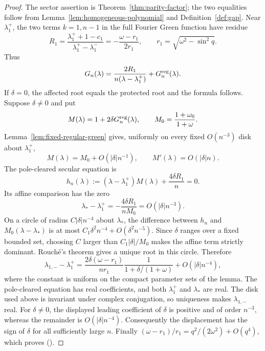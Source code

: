 \documentclass[twoside,10pt]{article}
\numberwithin{equation}{section}
\theoremstyle{slbody}
\theoremstyle{definition}
\theoremstyle{remark}
\renewcommand{\eqref}[1]{%
  \textup{{\normalfont(\oldstylenums{\ref{#1}}}\normalfont)}}
\begin{document}
\begin{proof}
The sector assertion is Theorem~\ref{thm:parity-factor}; the two
equalities follow from Lemma~\ref{lem:homogeneous-polynomial} and
Definition~\ref{def:gap}.  Near
$\lambda_1^+$, the two terms $k=1,n-1$ in the full Fourier Green
function have residue
\[
 R_1=\frac{\lambda_1^++1-c_1}{\lambda_1^+-\lambda_1^-}
    =-\frac{\omega-r_1}{2r_1},
 \qquad r_1=\sqrt{\omega^2-\sin^2q}.
\]
Thus
\[
 G_n(\lambda)=\frac{2R_1}{n(\lambda-\lambda_1^+)}
                  +G_n^{\rm reg}(\lambda).
\]
If $\delta=0$, the affected root equals the protected root and the
formula follows.  Suppose $\delta\ne0$ and put
\[
 M(\lambda)=1+2\delta G_n^{\rm reg}(\lambda),
 \qquad M_0=\frac{1+\omega_0}{1+\omega}.
\]
Lemma~\ref{lem:fixed-regular-green} gives, uniformly on every fixed
$O(n^{-3})$ disk about $\lambda_1^+$,
\[
 M(\lambda)=M_0+O(|\delta|n^{-1}),
 \qquad M'(\lambda)=O(|\delta|n).
\]
The pole-cleared secular equation is
\[
 h_n(\lambda):=(\lambda-\lambda_1^+)M(\lambda)
                  +\frac{4\delta R_1}{n}=0.
\]
Its affine comparison has the zero
\[
 \lambda_* -\lambda_1^+=-\frac{4\delta R_1}{nM_0}=O(|\delta|n^{-3}).
\]
On a circle of radius $C|\delta|n^{-4}$ about $\lambda_*$, the
difference between $h_n$ and
$M_0(\lambda-\lambda_*)$ is at most
$C_1\delta^2n^{-4}+O(\delta^2n^{-5})$.  Since $\delta$ ranges over a
fixed bounded set, choosing $C$ larger than $C_1|\delta|/M_0$ makes the
affine term strictly dominant.  Rouch\'e's theorem gives a unique root
in this circle.  Therefore
\[
 \lambda_{1,-}-\lambda_1^+
 =\frac{2\delta(\omega-r_1)}{nr_1}
    \frac{1}{1+\delta/(1+\omega)}+O(|\delta|n^{-4}),
\]
where the constant is uniform on the compact parameter sets of the
lemma.  The pole-cleared equation has real coefficients, and both
$\lambda_1^+$ and $\lambda_*$ are real.  The disk used above is invariant
under complex conjugation, so uniqueness makes $\lambda_{1,-}$ real.  For
$\delta\ne0$, the displayed leading coefficient of $\delta$ is positive
and of order $n^{-3}$, whereas the remainder is $O(|\delta|n^{-4})$.
Consequently the displacement has the sign of $\delta$ for all sufficiently
large $n$.  Finally
$(\omega-r_1)/r_1=q^2/(2\omega^2)+O(q^4)$, which proves
\eqref{eq:affected-gap-shift}.
\end{proof}
\end{document}
